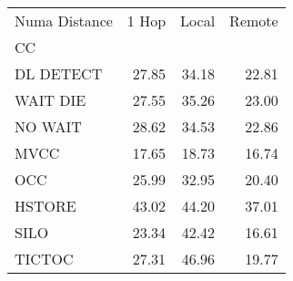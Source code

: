 \begin{tabular}{lrrr}
\toprule
Numa Distance &  1 Hop &  Local &  Remote \\
CC        &        &        &         \\
\midrule
DL DETECT &  27.85 &  34.18 &   22.81 \\
WAIT DIE  &  27.55 &  35.26 &   23.00 \\
NO WAIT   &  28.62 &  34.53 &   22.86 \\
MVCC      &  17.65 &  18.73 &   16.74 \\
OCC       &  25.99 &  32.95 &   20.40 \\
HSTORE    &  43.02 &  44.20 &   37.01 \\
SILO      &  23.34 &  42.42 &   16.61 \\
TICTOC    &  27.31 &  46.96 &   19.77 \\
\bottomrule
\end{tabular}
